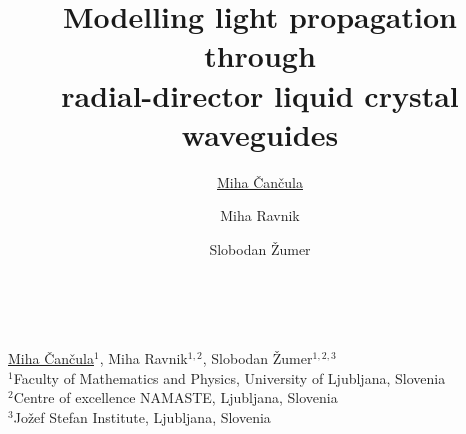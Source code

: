 \documentclass{beamer}
\title{Modelling light propagation through \\ radial-director liquid crystal waveguides}
\author{\underline{Miha \v Can\v cula\inst{1}}\and Miha Ravnik\inst{1,2}\and Slobodan \v Zumer\inst{1,2,3}}
\institute{\inst{1}Faculty of Mathematics and Physics, University of Ljubljana, Slovenia\and\inst{2}Centre of excellence NAMASTE, Ljubljana, Slovenia\and\inst{3}Jo\v zef Stefan Institute, Ljubljana, Slovenia}
\begin{document}
\begin{columns}
 \begin{column}{.976\textwidth}
  \begin{block}{}
\vspace{0.5cm}
\centering
{\fontsize{80}{96}\selectfont \inserttitle} \\
\vspace{1cm}
{\LARGE \underline{Miha \v Can\v cula$^{1}$}, Miha Ravnik$^{1,2}$, Slobodan \v Zumer$^{1,2,3}$} \\
\vspace{1cm}
{\large
$^{1}$Faculty of Mathematics and Physics, University of Ljubljana, Slovenia\\
$^{2}$Centre of excellence NAMASTE, Ljubljana, Slovenia \\
$^{3}$Jo\v zef Stefan Institute, Ljubljana, Slovenia
}
\vspace{0.5cm}
\end{block}


 \end{column}
\end{columns}
\end{document}
